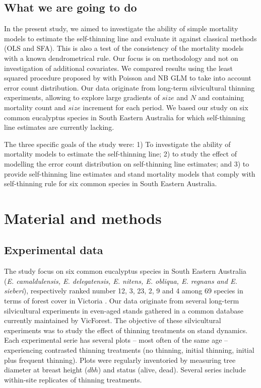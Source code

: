 \documentclass[12pt,english]{article}
\begin{document}
\medskip
\subsection{What we are going to do} 

In the present study, we aimed to investigate the ability of simple mortality models to estimate the self-thinning line and evaluate it against classical methods (OLS and SFA). This is also a test of the consistency of the mortality models with a known dendrometrical rule. Our focus is on methodology and not on investigation of additional covariates. We compared results using the least squared procedure proposed by \citet{Garcia2009} with Poisson and NB GLM to take into account error count distribution. Our data originate from long-term silvicultural thinning experiments, allowing to explore large gradients of $size$ and $N$ and containing mortality count and $size$ increment for each period. We based our study on six common eucalyptus species in South Eastern Australia for which self-thinning line estimates are currently lacking.

The three specific goals of the study were: 1) To investigate the ability of mortality models to estimate the self-thinning line; 2) to study the effect of modelling the error count distribution on self-thinning line estimates; and 3) to provide self-thinning line estimates and stand mortality models that comply with self-thinning rule for six common species in South Eastern Australia.

\newpage
\section{Material and methods}
\subsection{Experimental data}
The study focus on six common eucalyptus species in South Eastern Australia (\textit{E. camaldulensis, E. delegatensis,  E. nitens, E. obliqua, E. regnans and E. sieberi}), respectively ranked number 12, 3, 23, 2, 9 and 4 among 69 species in terms of forest cover in Victoria \citep{DNRE2007}. Our data originate from several long-term silvicultural experiments in even-aged stands gathered in a common database currently maintained by VicForest. The objective of these silvicultural experiments was to study the effect of thinning treatments on stand dynamics. Each experimental serie has several plots -- most often of the same age -- experiencing contrasted thinning treatments (no thinning, initial thinning, initial plus frequent thinning). Plots were regularly inventoried by measuring tree diameter at breast height ($dbh$) and status (alive, dead). Several series include within-site replicates of thinning treatments.
\end{document}
